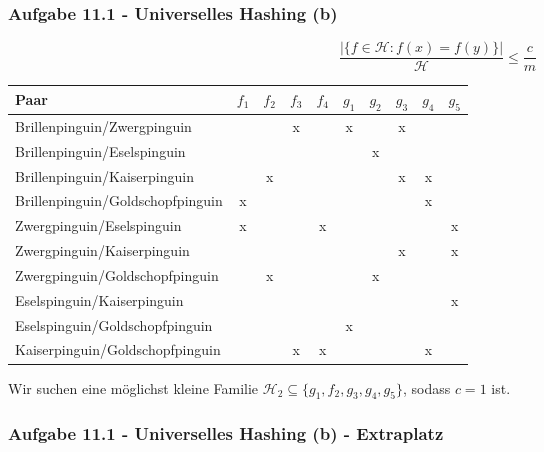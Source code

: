 \documentclass{beamer}
\begin{document}
\begin{frame}[t]
	\frametitle{Aufgabe 11.1 - Universelles Hashing (b)}

	\scriptsize
	$$\frac{|\{ f \in \mathcal{H} : f(x) = f(y) \}|}{\mathcal{H}} \leq \frac{c}{m}$$
	\begin{table}
		\tiny
		\centering
		\begin{tabular}{|l||c|c|c|c||c|c|c|c|c|}
			\hline
			Paar                             & $f_1$ & $f_2$ & $f_3$ & $f_4$ & $g_1$ & $g_2$ & $g_3$ & $g_4$ & $g_5$ \\
			\hline\hline
			Brillenpinguin/Zwergpinguin      &       &       & x     &       & x     &       & x     &       &       \\
			\hline
			Brillenpinguin/Eselspinguin      &       &       &       &       &       & x     &       &       &       \\
			\hline
			Brillenpinguin/Kaiserpinguin     &       & x     &       &       &       &       & x     & x     &       \\
			\hline
			Brillenpinguin/Goldschopfpinguin & x     &       &       &       &       &       &       & x     &       \\
			\hline
			Zwergpinguin/Eselspinguin        & x     &       &       & x     &       &       &       &       & x     \\
			\hline
			Zwergpinguin/Kaiserpinguin       &       &       &       &       &       &       & x     &       & x     \\
			\hline
			Zwergpinguin/Goldschopfpinguin   &       & x     &       &       &       & x     &       &       &       \\
			\hline
			Eselspinguin/Kaiserpinguin       &       &       &       &       &       &       &       &       & x     \\
			\hline
			Eselspinguin/Goldschopfpinguin   &       &       &       &       & x     &       &       &       &       \\
			\hline
			Kaiserpinguin/Goldschopfpinguin  &       &       & x     & x     &       &       &       & x     &       \\
			\hline
		\end{tabular}
	\end{table}

	Wir suchen eine möglichst kleine Familie $\mathcal{H}_2 \subseteq \{ g_1, f_2, g_3, g_4, g_5 \}$, sodass $c = 1$ ist.
\end{frame}

\begin{frame}
	\frametitle{Aufgabe 11.1 - Universelles Hashing (b) - Extraplatz}
\end{frame}
\end{document}
